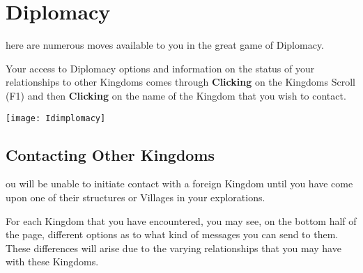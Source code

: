 
\chapter{Diplomacy}

here are numerous moves available to you in the great game of Diplomacy.


Your access to Diplomacy options and information on the status of your relationships to other Kingdoms comes through \textbf{Clicking} on the Kingdoms Scroll (F1) and then \textbf{Clicking} on the name of the Kingdom that you wish to contact.

\begin{center}
    \texttt{[image: Idimplomacy]} %
\end{center}

\section{Contacting Other Kingdoms}


ou will be unable to initiate contact with a foreign Kingdom until you have come upon one of their structures or Villages in your explorations.


For each Kingdom that you have encountered, you may see, on the bottom half of the page, different options as to what kind of messages you can send to them. These differences will arise due to the varying relationships that you may have with these Kingdoms.

